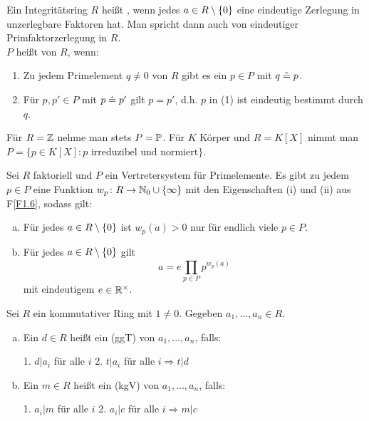 \begin{defn} \label{def_1.8}
	Ein Integritätsring $R$ heißt , wenn jedes $a \in R \setminus \{0\}$ eine eindeutige Zerlegung in unzerlegbare Faktoren hat. Man spricht dann auch von eindeutiger Primfaktorzerlegung in $R$. \\
	$P$ heißt  von $R$, wenn:
	\begin{enumerate}[(1)]
		\item Zu jedem Primelement $q \neq 0$ von $R$ gibt es ein $p \in P$ mit $q \mathrel{\hat=} p$. 
		\item Für $p, p' \in P$ mit $p \mathrel{\hat=} p'$ gilt $p = p'$, d.h. $p$ in (1) ist eindeutig bestimmt durch $q$.
	\end{enumerate}
	Für $R = \mathbb{Z}$ nehme man stets $P = \mathbb{P}$. Für $K$ Körper und $R = K[X]$ nimmt man $P = \{p \in K[X] : p \text{ irreduzibel und normiert}\}$.  
\end{defn}

\begin{falko} \label{F1.7}
	Sei $R$ faktoriell und $P$ ein Vertretersystem für Primelemente. Es gibt zu jedem $p \in P$ eine Funktion $w_p \colon R \rightarrow \mathbb{N}_0 \cup \{\infty\}$ mit den Eigenschaften (i) und (ii) aus F\ref{F1.6}, sodass gilt: \begin{enumerate}[a)]
		\item Für jedes $a \in R \setminus \{0\}$ ist $w_p(a) > 0$ nur für endlich viele $p \in P$.
		\item Für jedes $a \in R \setminus \{0\}$ gilt
		\begin{equation}
			a = e \prod\limits_{p \in P}^{} p^{w_p(a)} \label{eq_F1.7}
		\end{equation}
		mit eindeutigem $e \in \mathbb{R}^\times$.
	\end{enumerate}
\end{falko}

\begin{defn} \label{def_1.9}
	Sei $R$ ein kommutativer Ring mit $1 \neq 0$. Gegeben $a_1, \dots, a_n \in R$.
	\begin{enumerate}[a)]
		\item Ein $d \in R$ heißt ein  (ggT) von $a_1,\dots,a_n$, falls:
		\begin{center}
			1. \quad $d | a_i$ für alle $i$ \hspace{3cm} 2. \quad $t | a_i$ für alle $i \Rightarrow t | d$
		\end{center}
		\item Ein $m \in R$ heißt ein  (kgV) von $a_1,\dots,a_n$, falls:
		\begin{center}
			1. \quad $a_i | m$ für alle $i$ \hspace{3cm} 2. \quad $a_i | c$ für alle $i \Rightarrow m | c$
		\end{center}
	\end{enumerate}
\end{defn}

